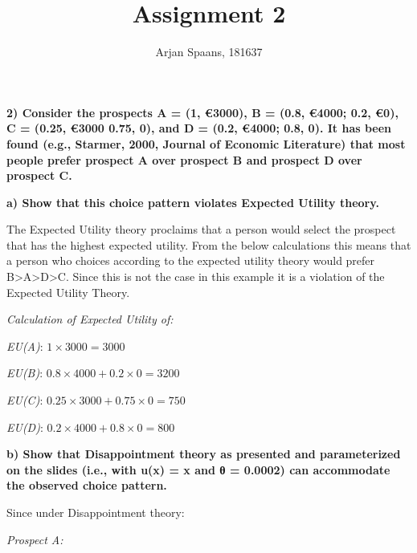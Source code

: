 \documentclass[12pt]{article}
\begin{document}
\title{Assignment 2}
\author{Arjan Spaans, 181637}	
	
\maketitle
	
	
\noindent \textbf{2) Consider the prospects A = (1, €3000), B = (0.8, €4000; 0.2, €0), C = (0.25, €3000 0.75, 0), and D = (0.2, €4000; 0.8, 0). It has been found (e.g., Starmer, 2000, Journal of Economic Literature) that most people prefer prospect A over prospect B and prospect D over prospect C. }

\vspace{5mm} 	
	
\noindent \textbf{a) Show that this choice pattern violates Expected Utility theory.}
	
\vspace{5mm} 	
	
\noindent The Expected Utility theory proclaims that a person would select the prospect that has the highest expected utility. From the below calculations this means that a person who choices according to the expected utility theory would prefer B>A>D>C. Since this is not the case in this example it is a violation of the Expected Utility Theory.

\vspace{5mm} 

\noindent \textit{Calculation of Expected Utility of:}

\vspace{5mm} 

\textit{ EU(A)}: $1\times3000 = 3000$

\textit{ EU(B)}: $0.8\times4000 + 0.2\times0 = 3200$

\textit{ EU(C)}: $0.25\times3000 + 0.75\times0 = 750$

\textit{ EU(D)}: $0.2\times4000 + 0.8\times0 = 800$

\vspace{5mm}

\noindent \textbf{b) Show that Disappointment theory as presented and parameterized on the slides (i.e., with u(x) = x and θ = 0.0002) can accommodate the observed choice pattern.}

\vspace {5mm}

\noindent Since under Disappointment theory:

\vspace{5mm}

\noindent \textit{Prospect A:}
\end{document}
